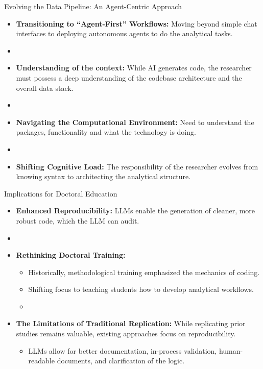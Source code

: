 \documentclass[xcolor=x11names,compress,9pt]{beamer}
\renewcommand{\(}{\begin{columns}}
\renewcommand{\)}{\end{columns}}
\newcommand{\<}[1]{\begin{column}{#1}}
\renewcommand{\>}{\end{column}}
\begin{document}
\begin{frame}{Evolving the Data Pipeline: An Agent-Centric Approach}
    \begin{itemize}
        \item \textbf{Transitioning to ``Agent-First'' Workflows:} Moving beyond simple chat interfaces to deploying autonomous agents to do the analytical tasks. 
        \item []
        \item \textbf{Understanding of the context:} While AI generates code, the researcher must possess a deep understanding of the codebase architecture and the overall data stack.
        \item []
        \item \textbf{Navigating the Computational Environment:} Need to understand the packages, functionality and what the technology is doing. 
        \item []
        \item \textbf{Shifting Cognitive Load:} The responsibility of the researcher evolves from knowing syntax to architecting the analytical structure.
    \end{itemize}
\end{frame}

\begin{frame}{Implications for Doctoral Education}
    \begin{itemize}
        \item \textbf{Enhanced Reproducibility:} LLMs enable the generation of cleaner, more robust code, which the LLM can audit.
        \item []
        \item \textbf{Rethinking Doctoral Training:} 
        \begin{itemize}
            \item Historically, methodological training emphasized the mechanics of coding.
            \item Shifting focus to teaching students how to develop analytical workflows.
            \item []
        \end{itemize}
        \item \textbf{The Limitations of Traditional Replication:} While replicating prior studies remains valuable, existing approaches focus on reproducibility. 
        \begin{itemize}
            \item LLMs allow for better documentation, in-process validation, human-readable documents, and clarification of the logic. 
        \end{itemize}
    \end{itemize}
\end{frame}
\end{document}
